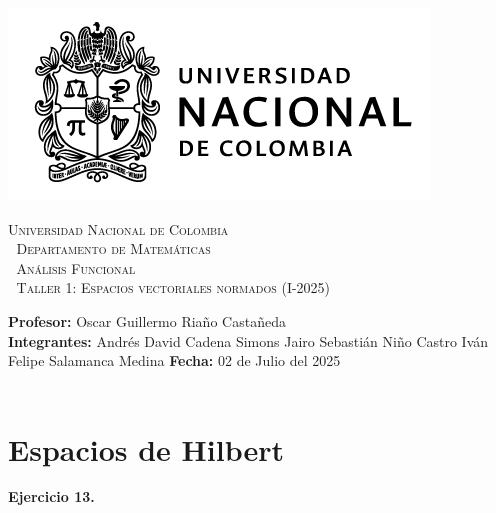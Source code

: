 \thispagestyle{empty}

\begin{minipage}{0.3\textwidth}
  \includegraphics[scale=0.35]{logounal.png}
\end{minipage}%
\hfill
\begin{minipage}{0.65\textwidth}
  \begin{center}
    \scshape
    \Large \textsc{Universidad Nacional de Colombia} \\
    \textcolor{white}{\tiny.} \Large \textsc{Departamento de Matemáticas} \\
    \textcolor{white}{\tiny.} \large \textsc{Análisis Funcional} \\
    \textcolor{white}{\tiny.} \large \textsf{Taller 1: Espacios vectoriales normados} \normalsize (I-2025)
  \end{center}
\end{minipage}

\vspace{0.3cm}
\normalfont

\textbf{Profesor:} Oscar Guillermo Riaño Castañeda\\
\textbf{Integrantes:} Andrés David Cadena Simons \hspace{2.8cm}  Jairo Sebastián Niño Castro\hspace{2.8cm}
Iván Felipe Salamanca Medina \hspace{5.05cm}\textbf{Fecha:} 02 de Julio del 2025\\
\vspace{0.25cm}\\

\section{Espacios de Hilbert}

\textbf{Ejercicio 13.}


